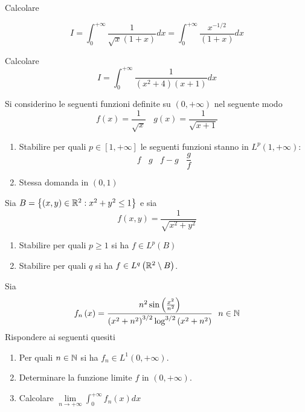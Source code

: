 Calcolare


\begin{equation*}
I = \int ^{ + \infty }_{0}\frac{1}{\sqrt{x}\left(1 + x\right)} dx = \int ^{ + \infty }_{0}\frac{x^{ - 1/2}}{\left(1 + x\right)} dx
\end{equation*}
\Esercizio{}

Calcolare
\begin{equation*}
I = \int ^{ + \infty }_{0}\frac{1}{\left(x^{2} + 4\right)\left(x + 1\right)} dx
\end{equation*}

Si considerino le seguenti funzioni definite su $\left(0, + \infty \right)$ nel seguente modo
\begin{equation*}
f\left(x\right) = \frac{1}{\sqrt{x}} \ \ \ \ g\left(x\right) = \frac{1}{\sqrt{x + 1}}
\end{equation*}
\begin{enumerate}
\item Stabilire per quali $p\in \left[ 1, + \infty \right]$ le seguenti funzioni stanno in $L^{p}\left(1, + \infty \right)$:\begin{equation*}
f\ \ \ \ g\ \ \ \ f - g\ \ \ \ \frac{g}{f}
\end{equation*}
\item Stessa domanda in $\left(0,1\right)$
\end{enumerate}
\Esercizio{ }

Sia $B = \left\{\left(x,y\right) \in \mathbb{R} ^{2} :x^{2} + y^{2} \leq 1\right\}$ e sia
\begin{equation*}
f\left(x,y\right) = \frac{1}{\sqrt{x^{2} + y^{2}}}
\end{equation*}
\begin{enumerate}
\item Stabilire per quali $p\geq 1$ si ha $f\in L^{p}\left(B\right)$
\item Stabilire per quali $q$ si ha $f\in L^{q}\left(\mathbb{R} ^{2} \setminus B\right)$.
\end{enumerate}
\Esercizio{}

Sia
\begin{equation*}
f_{n}\left(x\right) = \frac{n^{2}\sin\left(\frac{x^{2}}{n^{2}}\right)}{\left(x^{2} + n^{2}\right)^{3/2}\log^{3/2}\left(x^{2} + n^{2}\right)} \ \ n\in \mathbb{N} 
\end{equation*}
Rispondere ai seguenti quesiti
\begin{enumerate}
\item Per quali $n\in \mathbb{N} $ si ha $f_{n} \in L^{1}\left(0, + \infty \right)$.
\item Determinare la funzione limite $f$ in $\left(0, + \infty \right)$.
\item Calcolare $\lim\limits _{n\rightarrow + \infty }\int ^{ + \infty }_{0} f_{n}\left(x\right) dx$
\end{enumerate}
\Esercizio{}

